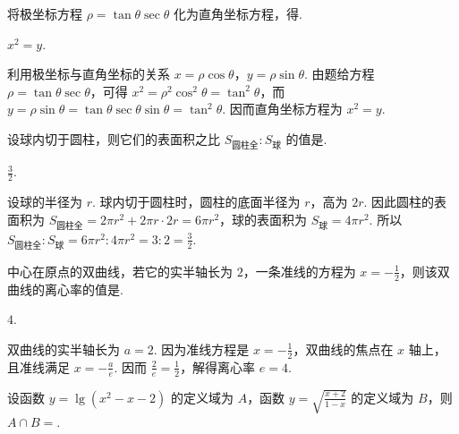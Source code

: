 \documentclass[UTF8,a4paper,oneside,11pt]{ctexbook}
\begin{document}
\begin{problem}

将极坐标方程 \(\rho = \tan \theta \sec \theta \) 化为直角坐标方程，得\fillinblank{}.
\end{problem}

\begin{answer}
\(x^{2}=y\).
\end{answer}

\begin{solution}
利用极坐标与直角坐标的关系 \(x=\rho\cos\theta\)，\(y=\rho\sin\theta\). 由题给方程 \(\rho=\tan\theta\sec\theta\)，可得
\(x^2=\rho^2\cos^2\theta=\tan^2\theta\)，而 \(y=\rho\sin\theta=\tan\theta\sec\theta\sin\theta=\tan^2\theta\). 因而直角坐标方程为 \(x^2=y\).
\end{solution}

\begin{problem}

设球内切于圆柱，则它们的表面积之比 \(S_{\text{圆柱全}} : S_{\text{球}} \) 的值是\fillinblank{}.
\end{problem}

\begin{answer}
\(\frac{3}{2} \).
\end{answer}

\begin{solution}
设球的半径为 \(r\). 球内切于圆柱时，圆柱的底面半径为 \(r\)，高为 \(2r\). 因此圆柱的表面积为 \(S_{\text{圆柱全}}=2\pi r^2+2\pi r\cdot2r=6\pi r^2\)，球的表面积为 \(S_{\text{球}}=4\pi r^2\). 所以 \(S_{\text{圆柱全}}:S_{\text{球}}=6\pi r^2:4\pi r^2=3:2=\frac32\).
\end{solution}

\begin{problem}

中心在原点的双曲线，若它的实半轴长为 \(2\)，一条准线的方程为 \(x = -\frac{1}{2} \)，则该双曲线的离心率的值是\fillinblank{}.
\end{problem}

\begin{answer}
\(4\).
\end{answer}

\begin{solution}
双曲线的实半轴长为 \(a=2\). 因为准线方程是 \(x=-\frac12\)，双曲线的焦点在 \(x\) 轴上，且准线满足 \(x=-\frac{a}{e}\). 因而 \(\frac{2}{e}=\frac12\)，解得离心率 \(e=4\).
\end{solution}

\begin{problem}

设函数 \(y = \lg(x^2 - x - 2) \) 的定义域为 \(A\)，函数 \(y = \sqrt{\frac{x + 2}{1 - x}} \) 的定义域为 \(B\)，则 \(A \cap B = \)\fillinblank{}.
\end{problem}
\end{document}
